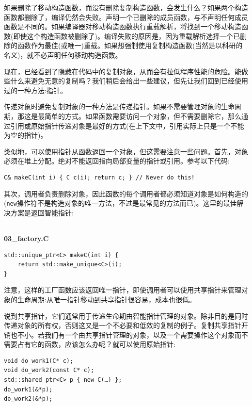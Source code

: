 如果删除了移动构造函数，而没有删除复制构造函数，会发生什么？如果两个构造函数都删除了，编译仍然会失败。声明一个已删除的成员函数，与不声明任何成员函数是不同的。如果编译器对移动构造函数执行重载解析，将找到一个移动构造函数(即使这个构造函数被删除了)。编译失败的原因是，因为重载解析选择一个已删除的函数作为最佳(或唯一)重载。如果想强制使用复制构造函数(当然是以科研的名义)，就不必声明任何移动构造函数。 

现在，已经看到了隐藏在代码中的复制对象，从而会有拉低程序性能的危险。能做些什么来避免无意的复制吗？我们稍后会给出一些建议，但先让我们回到已经使用过的一种方法:指针。


传递对象时避免复制对象的一种方法是传递指针。如果不需要管理对象的生命周期，那这是最简单的方式。如果函数需要访问一个对象，但不需要删除它，那么通过引用或原始指针传递对象是最好的方式(在上下文中，引用实际上只是一个不能为空的指针)。 

类似地，可以使用指针从函数返回一个对象，但这需要注意一些问题。首先，对象必须在堆上分配。绝对不能返回指向局部变量的指针或引用。参考以下代码:

\begin{lstlisting}[style=styleCXX]
C& makeC(int i) { C c(i); return c; } // Never do this!
\end{lstlisting}

其次，调用者负责删除对象，因此函数的每个调用者都必须知道对象是如何构造的(\texttt{new}操作符不是构造对象的唯一方法，不过是最常见的方法而已)。这里的最佳解决方案是返回智能指针:

\hspace*{\fill} \\ %
\noindent
\textbf{03\_factory.C}
\begin{lstlisting}[style=styleCXX]
std::unique_ptr<C> makeC(int i) {
	return std::make_unique<C>(i);
}
\end{lstlisting}

注意，这样的工厂函数应该返回唯一指针，即使调用者可以使用共享指针来管理对象的生命周期:从唯一指针移动到共享指针很容易，成本也很低。

说到共享指针，它们通常用于传递生命期由智能指针管理的对象。除非目的是同时传递对象的所有权，否则这又是一个不必要和低效的复制的例子。复制共享指针开销也不小。若我们有一个由共享指针管理的对象，以及一个需要操作这个对象而不需要占有它的函数，应该怎么办呢？就可以使用原始指针:

\begin{lstlisting}[style=styleCXX]
void do_work1(C* c);
void do_work2(const C* c);
std::shared_ptr<C> p { new C(…) };
do_work1(&*p);
do_work2(&*p);
\end{lstlisting}

